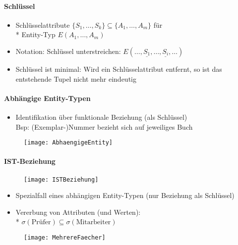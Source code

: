 \paragraph{Schlüssel}
\begin{itemize}
	\item Schlüsselattribute \( \{ S_1, \dots, S_k \} \subseteq \{ A_1, \dots, A_m \} \) für \\* Entity-Typ \( E(A_1, \dots, A_m) \)
	\item Notation: Schlüssel unterstreichen: \( E(\dots, \underline{S_1}, \dots, \underline{S_i}, \dots) \)
	\item Schlüssel ist minimal: Wird ein Schlüsselattribut entfernt, so ist das entstehende Tupel nicht mehr eindeutig
\end{itemize}

\paragraph{Abhängige Entity-Typen}
\begin{itemize}
	\item Identifikation über funktionale Beziehung (als Schlüssel)\\
	Bsp: (Exemplar-)Nummer bezieht sich auf jeweiliges Buch
\end{itemize}
\begin{figure}[H]\centering\label{AbhaengigeEntity}\texttt{[image: AbhaengigeEntity]}\end{figure}

\paragraph{IST-Beziehung}
\begin{figure}[H]\centering\label{ISTBeziehung}\texttt{[image: ISTBeziehung]}\end{figure}
\begin{itemize}
	\item Spezialfall eines abhängigen Entity-Typen (nur Beziehung als Schlüssel)
	\item Vererbung von Attributen (und Werten): \\* \( \sigma(\text{Prüfer}) \subseteq \sigma(\text{Mitarbeiter}) \)
\end{itemize}
\begin{figure}[H]\centering\label{MehrereFaecher}\texttt{[image: MehrereFaecher]}\end{figure}

